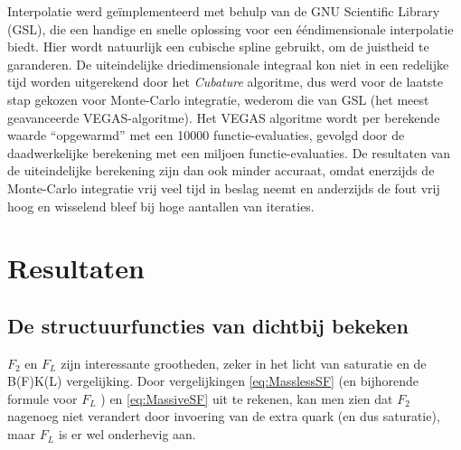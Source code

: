 \documentclass[a4paper,11pt]{article}
\numberwithin{equation}{section} %
\begin{document}
Interpolatie werd geïmplementeerd met behulp van de GNU Scientific Library (GSL), die een handige en snelle oplossing voor een ééndimensionale interpolatie biedt.
Hier wordt natuurlijk een cubische spline gebruikt, om de juistheid te garanderen.
De uiteindelijke driedimensionale integraal kon niet in een redelijke tijd worden uitgerekend door het \textit{Cubature} algoritme, dus werd voor de laatste stap gekozen voor Monte-Carlo integratie, wederom die van GSL (het meest geavanceerde VEGAS-algoritme).
Het VEGAS algoritme wordt per berekende waarde “opgewarmd” met een 10000 functie-evaluaties, gevolgd door de daadwerkelijke berekening met een miljoen functie-evaluaties.
De resultaten van de uiteindelijke berekening zijn dan ook minder accuraat, omdat enerzijds de Monte-Carlo integratie vrij veel tijd in beslag neemt en anderzijds de fout vrij hoog en wisselend bleef bij hoge aantallen van iteraties.

\section{Resultaten}
    \subsection{De structuurfuncties van dichtbij bekeken} \label{sec:ResSF}
$F_2$ en $F_L$ zijn interessante grootheden, zeker in het licht van saturatie en de B(F)K(L) vergelijking.
Door vergelijkingen \eqref{eq:MasslessSF} (en bijhorende formule voor $F_L$ \cite[sectie 9.5.4]{Barone}) en \eqref{eq:MassiveSF} uit te rekenen, kan men zien dat $F_2$ nagenoeg niet verandert door invoering van de extra quark (en dus saturatie), maar $F_L$ is er wel onderhevig aan.
\end{document}
